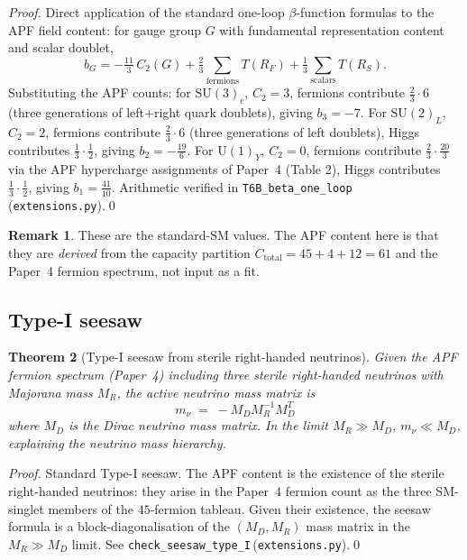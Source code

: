 \documentclass[11pt,a4paper]{article}
\newtheorem{theorem}{Theorem}[section]
\theoremstyle{definition}
\newtheorem{remark}[theorem]{Remark}
\newcommand{\Ctot}{C_{\mathrm{total}}}
\newcommand{\SU}[1]{\mathrm{SU}(#1)}
\newcommand{\U}[1]{\mathrm{U}(#1)}
\newcommand{\coderef}[2]{\texttt{#1}\,(\texttt{#2})}
\begin{document}
\begin{proof}
Direct application of the standard one-loop $\beta$-function formulas to the APF field content: for gauge group $G$ with fundamental representation content and scalar doublet,
\[
   b_G = -\tfrac{11}{3}\,C_2(G) + \tfrac{2}{3}\sum_{\mathrm{fermions}} T(R_F) + \tfrac{1}{3}\sum_{\mathrm{scalars}} T(R_S).
\]
Substituting the APF counts: for $\SU{3}_c$, $C_2=3$, fermions contribute $\tfrac{2}{3}\cdot 6$ (three generations of left+right quark doublets), giving $b_3=-7$.  For $\SU{2}_L$, $C_2=2$, fermions contribute $\tfrac{2}{3}\cdot 6$ (three generations of left doublets), Higgs contributes $\tfrac{1}{3}\cdot\tfrac{1}{2}$, giving $b_2=-\tfrac{19}{6}$.  For $\U{1}_Y$, $C_2=0$, fermions contribute $\tfrac{2}{3}\cdot\tfrac{20}{3}$ via the APF hypercharge assignments of Paper~4 (Table 2), Higgs contributes $\tfrac{1}{3}\cdot\tfrac{1}{2}$, giving $b_1=\tfrac{41}{10}$.  Arithmetic verified in \coderef{T6B\_beta\_one\_loop}{extensions.py}.\qed
\end{proof}

\begin{remark}
These are the standard-SM values.  The APF content here is that they are \emph{derived} from the capacity partition $\Ctot=45+4+12=61$ and the Paper~4 fermion spectrum, not input as a fit.
\end{remark}

\subsection{Type-I seesaw}

\begin{theorem}[Type-I seesaw from sterile right-handed neutrinos]
\label{thm:seesaw}
Given the APF fermion spectrum (Paper~4) including three sterile right-handed neutrinos with Majorana mass $M_R$, the active neutrino mass matrix is
\[
   m_\nu \;=\; -M_D M_R^{-1} M_D^T
\]
where $M_D$ is the Dirac neutrino mass matrix.  In the limit $M_R\gg M_D$, $m_\nu\ll M_D$, explaining the neutrino mass hierarchy.
\end{theorem}

\begin{proof}
Standard Type-I seesaw.  The APF content is the existence of the sterile right-handed neutrinos: they arise in the Paper~4 fermion count as the three SM-singlet members of the $45$-fermion tableau.  Given their existence, the seesaw formula is a block-diagonalisation of the $(M_D, M_R)$ mass matrix in the $M_R\gg M_D$ limit.  See \coderef{check\_seesaw\_type\_I}{extensions.py}.\qed
\end{proof}
\end{document}
